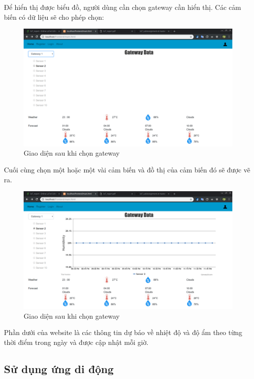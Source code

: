 \documentclass[a4paper]{article}
\begin{document}
    Để hiển thị được biểu đồ, người dùng cần chọn gateway cần hiển thị. Các cảm biến có dữ liệu sẽ cho phép chọn:
    \begin{figure}[htp]
        \centering
        \includegraphics[scale=0.3]{gatewaySelect.png}
        \caption{Giao diện sau khi chọn gateway}
        \label{fig:my_label}
    \end{figure}
    Cuối cùng chọn một hoặc một vài cảm biến và đồ thị của cảm biến đó sẽ được vẽ ra.
    \begin{figure}[htp]
        \centering
        \includegraphics[scale=0.3]{sensorSelect.png}
        \caption{Giao diện sau khi chọn gateway}
        \label{fig:my_label}
    \end{figure}
    Phần dưới của website là các thông tin dự báo về nhiệt độ và độ ẩm theo từng thời điểm trong ngày và được cập nhật mỗi giờ.
    

	\subsection{Sử dụng ứng di động}
\end{document}
